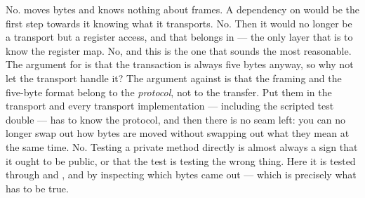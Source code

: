  No.  moves bytes and knows nothing about frames. A dependency on
 would be the first step towards it knowing what it transports.
 No. Then it would no longer be a transport but a register access, and that belongs in
 --- the only layer that is to know the register map.
 No, and this is the one that sounds the most reasonable. The argument for is that the
transaction is always five bytes anyway, so why not let the transport handle it? The argument
against is that the  framing and the five-byte format belong to the \emph{protocol}, not
to the transfer. Put them in the transport and every transport implementation --- including the
scripted test double --- has to know the protocol, and then there is no seam left: you can no
longer swap out how bytes are moved without swapping out what they mean at the same time.
 No. Testing a private method directly is almost always a sign that it ought to be public,
or that the test is testing the wrong thing. Here it is tested through  and
, and by inspecting which bytes came out --- which is precisely what has to be
true.
